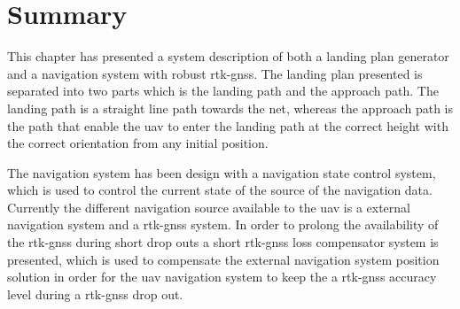 \section{Summary}
This chapter has presented a system description of both a landing plan generator and a navigation system with robust \gls{rtk-gnss}. The landing plan presented is separated into two parts which is the landing path and the approach path. The landing path is a straight line path towards the net, whereas the approach path is the path that enable the \gls{uav} to enter the landing path at the correct height with the correct orientation from any initial position.

The navigation system has been design with a navigation state control system, which is used to control the current state of the source of the navigation data. Currently the different navigation source available to the \gls{uav} is a external navigation system and a \gls{rtk-gnss} system. In order to prolong the availability of the \gls{rtk-gnss} during short drop outs a short \gls{rtk-gnss} loss compensator system is presented, which is used to compensate the external navigation system position solution in order for the \gls{uav} navigation system to keep the a \gls{rtk-gnss} accuracy level during a \gls{rtk-gnss} drop out.